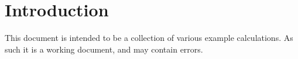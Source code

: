 \documentclass{article}
\begin{document}
\section{Introduction}
This document is intended to be a collection of various example calculations.
As such it is a working document, and may contain errors.


\end{document}
